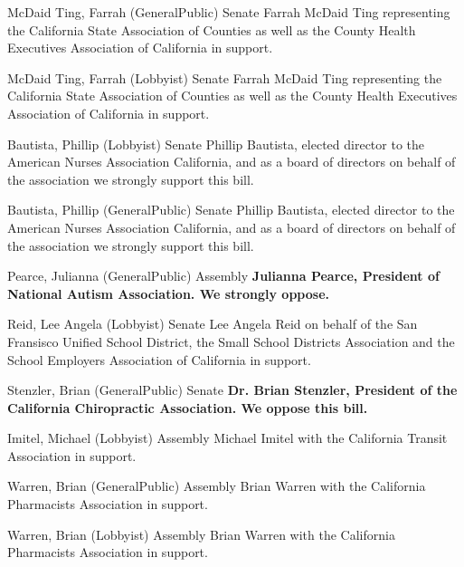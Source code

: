 \begin{result}{4.921907668723156}{McDaid Ting, Farrah (GeneralPublic) Senate}
Farrah McDaid Ting representing the California State Association of Counties as well as the County Health Executives Association of California in support.
\end{result}

\begin{result}{4.921907668723156}{McDaid Ting, Farrah (Lobbyist) Senate}
Farrah McDaid Ting representing the California State Association of Counties as well as the County Health Executives Association of California in support.
\end{result}

\begin{result}{4.902710968633834}{Bautista, Phillip (Lobbyist) Senate}
Phillip Bautista, elected director to the American Nurses Association California, and as a board of directors on behalf of the association we strongly support this bill.
\end{result}

\begin{result}{4.902710968633834}{Bautista, Phillip (GeneralPublic) Senate}
Phillip Bautista, elected director to the American Nurses Association California, and as a board of directors on behalf of the association we strongly support this bill.
\end{result}

\begin{result}{4.812498461251444}{Pearce, Julianna (GeneralPublic) Assembly}
\textbf{Julianna Pearce, President of National Autism Association. We strongly oppose.
}\end{result}

\begin{result}{4.792419477674715}{Reid, Lee Angela (Lobbyist) Senate}
Lee Angela Reid on behalf of the San Fransisco Unified School District, the Small School Districts Association and the School Employers Association of California in support.
\end{result}

\begin{result}{4.718879670218847}{Stenzler, Brian (GeneralPublic) Senate}
\textbf{Dr. Brian Stenzler, President of the California Chiropractic Association. We oppose this bill.
}\end{result}

\begin{result}{4.663139449522017}{Imitel, Michael (Lobbyist) Assembly}
Michael Imitel with the California Transit Association in support.
\end{result}

\begin{result}{4.638143430588506}{Warren, Brian (GeneralPublic) Assembly}
Brian Warren with the California Pharmacists Association in support.
\end{result}

\begin{result}{4.638143430588506}{Warren, Brian (Lobbyist) Assembly}
Brian Warren with the California Pharmacists Association in support.
\end{result}

